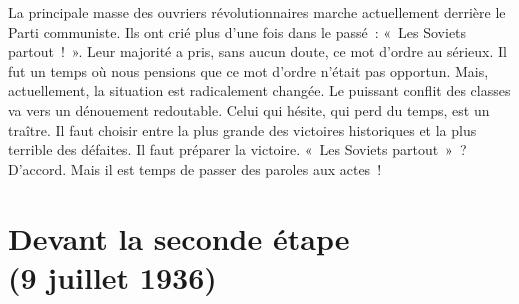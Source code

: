 \documentclass[french,twoside]{book} %
\newcommand\chapteropen{} %
\newcommand\chapterclose{} %
\begin{document}
La principale masse des ouvriers révolutionnaires marche actuellement derrière le Parti communiste. Ils ont crié plus d’une fois dans le passé : « Les Soviets partout ! ». Leur majorité a pris, sans aucun doute, ce mot d’ordre au sérieux. Il fut un temps où nous pensions que ce mot d’ordre n’était pas opportun. Mais, actuellement, la situation est radicalement changée. Le puissant conflit des classes va vers un dénouement redoutable. Celui qui hésite, qui perd du temps, est un traître. Il faut choisir entre la plus grande des victoires historiques et la plus terrible des défaites. Il faut préparer la victoire. « Les Soviets partout » ? D’accord. Mais il est temps de passer des paroles aux actes !
\chapterclose


\chapteropen
 \chapter[{Devant la seconde étape, (9 juillet 1936)}]{Devant la seconde étape \\
(9 juillet 1936)}
\label{p8}\renewcommand{\leftmark}{Devant la seconde étape \\
(9 juillet 1936)}
\end{document}
